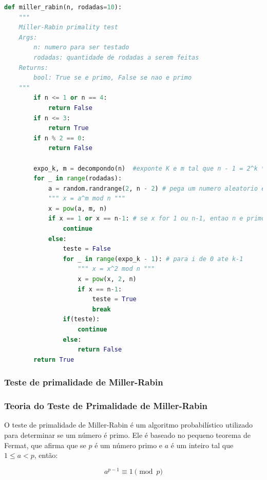 \documentclass{article}
\begin{document}
\begin{lstlisting}[language=Python]
    def miller_rabin(n, rodadas=10):
    """
    Miller-Rabin primality test
    Args:
        n: numero para ser testado
        rodadas: quantidade de rodadas a serem feitas
    Returns:
        bool: True se e primo, False se nao e primo
    """
        if n <= 1 or n == 4:
            return False
        if n <= 3:
            return True
        if n % 2 == 0:
            return False
        
        expo_k, m = decompondo(n)  #exponte K e m tal que n - 1 = 2^k * m
        for _ in range(rodadas):
            a = random.randrange(2, n - 2) # pega um numero aleatorio entre 2 e n-2
            """ x = a^m mod n """
            x = pow(a, m, n) 
            if x == 1 or x == n-1: # se x for 1 ou n-1, entao n e primo
                continue
            else:
                teste = False
                for _ in range(expo_k - 1): # para i de 0 ate k-1
                    """ x = x^2 mod n """ 
                    x = pow(x, 2, n)
                    if x == n-1:
                        teste = True
                        break
                if(teste):
                    continue
                else:
                    return False
        return True
    \end{lstlisting}

\subsubsection*{Teste de primalidade de Miller-Rabin}

\subsubsection*{Teoria do Teste de Primalidade de Miller-Rabin}

O teste de primalidade de Miller-Rabin é um algoritmo probabilístico utilizado para determinar se um número é primo. Ele é baseado no pequeno teorema de Fermat, que afirma que se \( p \) é um número primo e \( a \) é um inteiro tal que \( 1 \leq a < p \), então:

\[
a^{p-1} \equiv 1 \pmod{p}
\]
\end{document}
